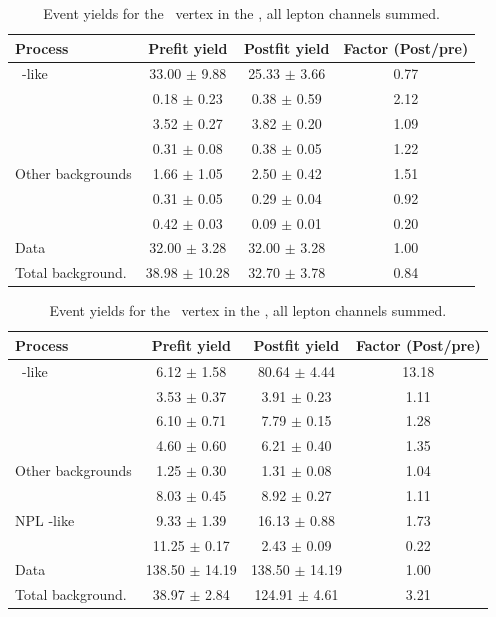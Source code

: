 \begin{table}[htbp]
	\centering
		\caption{Event yields for the \Zut\ vertex in the \STCR,   all lepton channels summed. }
	
	\begin{tabular} {l c c c }
		\toprule
		Process & Prefit yield & Postfit yield & Factor (Post/pre) \\
		\midrule
		\NPL\ \ttbar-like & 33.00 $ \pm $ 9.88 & 25.33 $ \pm $ 3.66 & 0.77 \\ 
		\ttZ & 0.18 $ \pm $ 0.23 & 0.38 $ \pm $ 0.59 & 2.12 \\ 
		\WZ & 3.52 $ \pm $ 0.27 & 3.82 $ \pm $ 0.20 & 1.09 \\ 
		\ZZ & 0.31 $ \pm $ 0.08 & 0.38 $ \pm $ 0.05 & 1.22 \\ 
		Other backgrounds & 1.66 $ \pm $ 1.05 & 2.50 $ \pm $ 0.42 & 1.51 \\ 
		\tZq & 0.31 $ \pm $ 0.05 & 0.29 $ \pm $ 0.04 & 0.92 \\ 
		\kZut  & 0.42 $ \pm $ 0.03 & 0.09 $ \pm $ 0.01 & 0.20 \B \\
		\hdashline
		Data & 32.00 $ \pm $ 3.28 & 32.00 $ \pm $ 3.28 & 1.00 \T \\
		Total background. & 38.98 $ \pm $ 10.28 & 32.70 $ \pm $ 3.78 & 0.84\\
		\bottomrule
	\end{tabular}
\end{table}

\begin{table}[htbp]
	\centering
		\caption{Event yields for the \Zut\ vertex in the \STSR,   all lepton channels summed. }
	
	\begin{tabular} {l c c c }
		\toprule
		Process & Prefit yield & Postfit yield & Factor (Post/pre) \\
		\midrule
		\NPL\ \DY-like & 6.12 $ \pm $ 1.58 & 80.64 $ \pm $ 4.44 & 13.18 \\ 
		\ttZ & 3.53 $ \pm $ 0.37 & 3.91 $ \pm $ 0.23 & 1.11 \\ 
		\WZ & 6.10 $ \pm $ 0.71 & 7.79 $ \pm $ 0.15 & 1.28 \\ 
		\ZZ & 4.60 $ \pm $ 0.60 & 6.21 $ \pm $ 0.40 & 1.35 \\ 
		Other backgrounds & 1.25 $ \pm $ 0.30 & 1.31 $ \pm $ 0.08 & 1.04 \\ 
		\tZq & 8.03 $ \pm $ 0.45 & 8.92 $ \pm $ 0.27 & 1.11 \\ 
		NPL \ttbar-like & 9.33 $ \pm $ 1.39 & 16.13 $ \pm $ 0.88 & 1.73\\
		\kZut  & 11.25 $ \pm $ 0.17 & 2.43 $ \pm $ 0.09 & 0.22 \B \\
		\hdashline
		Data & 138.50 $ \pm $ 14.19 & 138.50 $ \pm $ 14.19 & 1.00 \T \\
		Total background. & 38.97 $ \pm $ 2.84 & 124.91 $ \pm $ 4.61 & 3.21\\
		\bottomrule
	\end{tabular}
\end{table}

